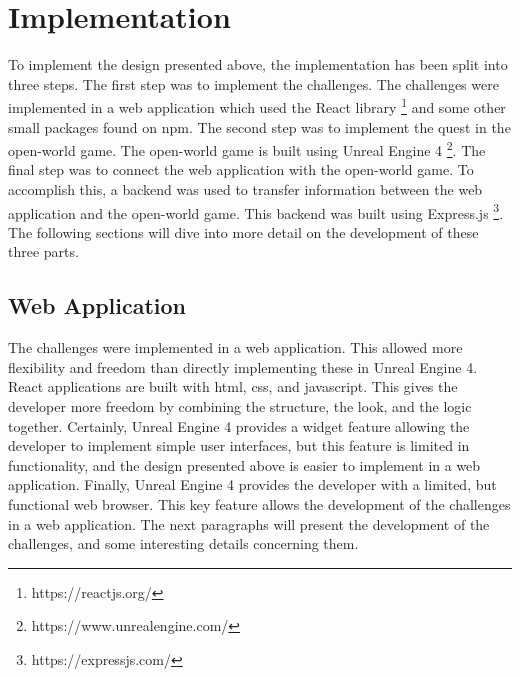 \documentclass{l4proj}
\begin{document}
\chapter{Implementation}

To implement the design presented above, the implementation has been split into three steps.
The first step was to implement the challenges. The challenges were implemented in a web application
which used the React library \footnote{https://reactjs.org/} and some other small packages found on npm.
The second step was to implement the quest in the open-world game. 
The open-world game is built using Unreal Engine 4 \footnote{https://www.unrealengine.com/}. 
The final step was to connect the web application with the open-world game. 
To accomplish this, a backend was used to transfer information between the web application and the open-world game.
This backend was built using Express.js \footnote{https://expressjs.com/}.
The following sections will dive into more detail on the development of these three parts.

\section{Web Application}

The challenges were implemented in a web application. 
This allowed more flexibility and freedom than directly implementing these in Unreal Engine 4.
React applications are built with html, css, and javascript. 
This gives the developer more freedom by combining the structure, the look, and the logic together.
Certainly, Unreal Engine 4 provides a widget feature allowing the developer to implement simple user interfaces, 
but this feature is limited in functionality, 
and the design presented above is easier to implement in a web application.
Finally, Unreal Engine 4 provides the developer with a limited, but functional web browser.
This key feature allows the development of the challenges in a web application.
The next paragraphs will present the development of the challenges, and some interesting details concerning them.
\end{document}
